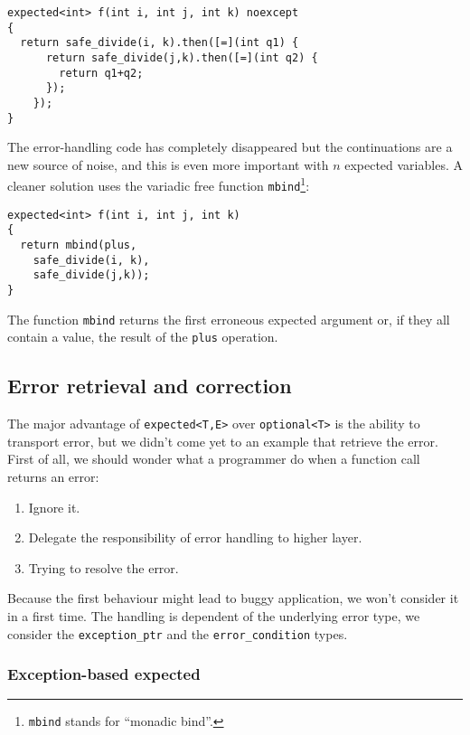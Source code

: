 \documentclass[a4paper,10pt]{article}
\newcommand{\cpp}[1]{\lstinline{#1}}
\begin{document}
\begin{lstlisting}
expected<int> f(int i, int j, int k) noexcept
{
  return safe_divide(i, k).then([=](int q1) {
      return safe_divide(j,k).then([=](int q2) {
        return q1+q2;
      });
    });
}
\end{lstlisting}

The error-handling code has completely disappeared but the continuations are a new source of noise, and this is even more important with $n$ expected variables. A cleaner solution uses the variadic free function \cpp{mbind}\footnote{\cpp{mbind} stands for ``monadic bind''.}:

\begin{lstlisting}
expected<int> f(int i, int j, int k)
{
  return mbind(plus,
    safe_divide(i, k), 
    safe_divide(j,k));
}
\end{lstlisting}

The function \cpp{mbind} returns the first erroneous expected argument or, if they all contain a value, the result of the \cpp{plus} operation.

\subsection{Error retrieval and correction}

The major advantage of \cpp{expected<T,E>} over \cpp{optional<T>} is the ability to transport error, but we didn't come yet to an example that retrieve the error. First of all, we should wonder what a programmer do when a function call returns an error:

\begin{enumerate}
 \item Ignore it.
 \item Delegate the responsibility of error handling to higher layer.
 \item Trying to resolve the error.
\end{enumerate}

Because the first behaviour might lead to buggy application, we won't consider it in a first time. The handling is dependent of the underlying error type, we consider the \cpp{exception_ptr} and the \cpp{error_condition} types.

\subsubsection{Exception-based expected}
\label{exception-based-expected}
\end{document}

